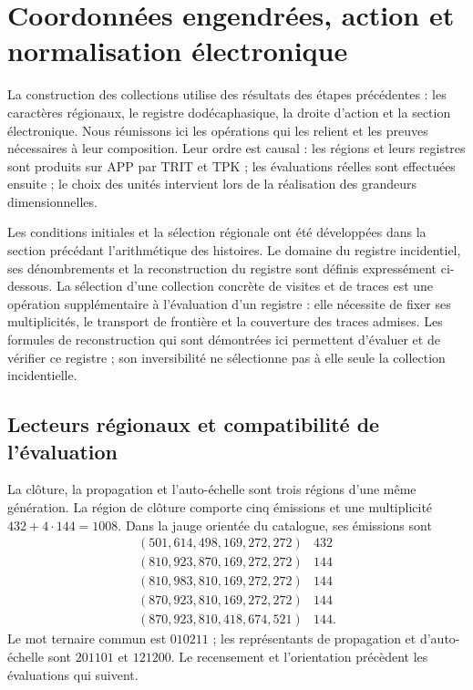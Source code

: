 \section{Coordonnées engendrées, action et normalisation électronique}
\label{vi:dep:seccion}

La construction des collections utilise des résultats des étapes précédentes :
les caractères régionaux, le registre dodécaphasique, la droite d’action et la
section électronique. Nous réunissons ici les opérations qui les relient et les
preuves nécessaires à leur composition. Leur ordre est causal : les régions et leurs
registres sont produits sur APP par TRIT et TPK ; les évaluations réelles
sont effectuées ensuite ; le choix des unités intervient lors de la réalisation des
grandeurs dimensionnelles.

Les conditions initiales et la sélection régionale ont été développées dans
la section précédant l’arithmétique des histoires. Le domaine du registre
incidentiel, ses dénombrements et la reconstruction du registre sont définis
expressément ci-dessous. La sélection d’une collection concrète de
visites et de traces est une opération supplémentaire à l’évaluation d’un registre :
elle nécessite de fixer ses multiplicités, le transport de frontière et la
couverture des traces admises. Les formules de reconstruction qui sont
démontrées ici permettent d’évaluer et de vérifier ce registre ; son
inversibilité ne sélectionne pas à elle seule la collection incidentielle.

\subsection{Lecteurs régionaux et compatibilité de l’évaluation}
\label{vi:dep:regiones}

La clôture, la propagation et l’auto-échelle sont trois régions d’une même
génération. La région de clôture comporte cinq émissions et une multiplicité
\(432+4\cdot144=1008\). Dans la jauge orientée du catalogue, ses émissions
sont
\[
\begin{array}{c|r}
(501,614,498,169,272,272)&432\\
(810,923,870,169,272,272)&144\\
(810,983,810,169,272,272)&144\\
(870,923,810,169,272,272)&144\\
(870,923,810,418,674,521)&144.
\end{array}
\]
Le mot ternaire commun est \(010211\) ; les représentants de propagation
et d’auto-échelle sont \(201101\) et \(121200\). Le recensement et l’orientation
précèdent les évaluations qui suivent.

